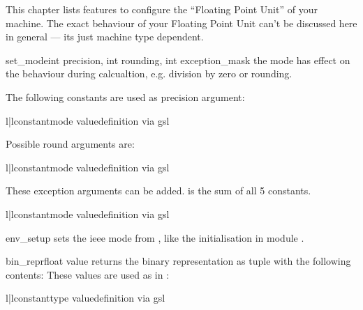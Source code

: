 
This chapter lists features to configure the ``Floating Point Unit'' of your machine.
The exact behaviour of your Floating Point Unit can't be discussed here in general --- its just machine type dependent.

\begin{funcdesc} {set_mode}{int precision, int rounding, int exception\_mask}
the mode has effect on the behaviour during calcualtion, e.g. division by zero or rounding.

The following constants are used as precision argument:
\begin{tableii}{l|l}{constant}{mode value}{definition via gsl}
\end{tableii}
Possible round arguments are:
\begin{tableii}{l|l}{constant}{mode value}{definition via gsl}
\end{tableii}
These exception arguments can be added.
 is the sum of all 5  constants.
\begin{tableii}{l|l}{constant}{mode value}{definition via gsl}
\end{tableii}
\end{funcdesc}

\begin{funcdesc} {env\_setup}{}
sets the ieee mode from , like the initialisation in module .
\end{funcdesc}

\begin{funcdesc} {bin\_repr}{float value}
returns the binary representation as tuple with the following contents:
These values are used as  in :
\begin{tableii}{l|l}{constant}{type value}{definition via gsl}
\end{tableii}
\end{funcdesc}
